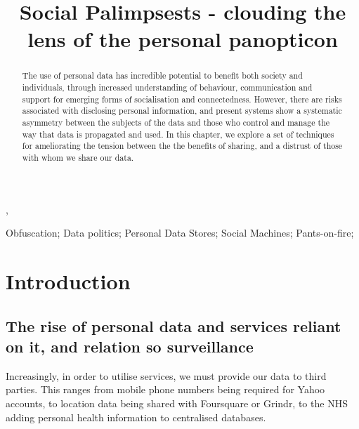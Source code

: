 \documentclass{IOS-Book-Article}     %
\begin{document}
\begin{frontmatter}          %
%
\title{Social Palimpsests - clouding the lens of the personal panopticon}

\author[A]{ },
\author[B]{ }
\author[B]{ }
\address[A]{Centre for Intelligent Systems and Applications,
Department of Informatics, University of Edinburgh}
\address[B]{Southampton}

\begin{abstract}
The use of personal data has incredible potential to benefit both society and
individuals, through increased understanding of behaviour, communication and
support for emerging forms of socialisation and connectedness. However, there
are risks associated with disclosing personal information, and present systems
show a systematic asymmetry between the subjects of the data and those who
control and manage the way that data is propagated and used. In this chapter, we
explore a set of techniques for ameliorating the tension between the 
the benefits of sharing, and a distrust of those with whom we share our data.
\end{abstract}

\begin{keyword}
Obfuscation; Data politics; Personal Data Stores; Social Machines; Pants-on-fire;
\end{keyword}

\end{frontmatter}


\section*{Introduction}

\subsection*{The rise of personal data and services reliant on it, and relation
so surveillance}



Increasingly, in order to utilise services, we must provide our data to third
parties. This ranges from mobile phone numbers being required for Yahoo
accounts, to location data being shared with Foursquare or Grindr, to the NHS
adding personal health information to centralised databases. 
\end{document}
